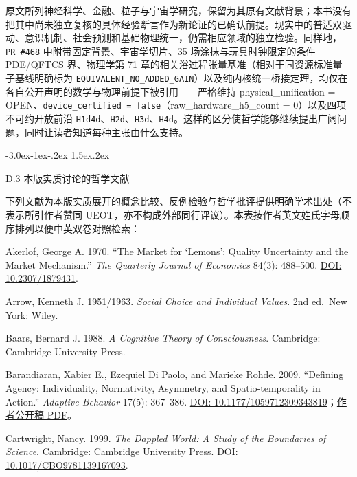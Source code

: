 \documentclass[
  11pt,
  oneside]{book}
\makeatletter
\renewcommand\section{\@startsection{section}{1}{\z@}%
  {-3.0ex\@plus-1ex\@minus-.2ex}%
  {1.5ex\@plus.2ex}%
  {\normalfont\Large\bfseries\raggedright\hyphenpenalty=10000\exhyphenpenalty=10000}}
\makeatother
\begin{document}
原文所列神经科学、金融、粒子与宇宙学研究，保留为其原有文献背景；本书没有把其中尚未独立复核的具体经验断言作为新论证的已确认前提。现实中的普适双驱动、意识机制、社会预测和基础物理统一，仍需相应领域的独立检验。同样地，\texttt{PR\ \#468} 中附带固定背景、宇宙学切片、35 场涂抹与玩具时钟限定的条件 PDE/QFTCS 界、物理学第 71 章的相关浴过程张量基准（相对于同资源标准量子基线明确标为 \texttt{EQUIVALENT\_NO\_ADDED\_GAIN}）以及纯内核统一桥接定理，均仅在各自公开声明的数学与物理前提下被引用------严格维持 physical\_unification = OPEN、\texttt{device\_certified\ =\ false}（raw\_hardware\_h5\_count = 0）以及四项不可约开放前沿 \texttt{H1d4d}、\texttt{H2d}、\texttt{H3d}、\texttt{H4d}。这样的区分使哲学能够继续提出广阔问题，同时让读者知道每种主张由什么支持。

\section{D.3 本版实质讨论的哲学文献}\label{ph-d-3}

\begingroup\small\raggedright\setlength{\parskip}{0.25em}

下列文献为本版实质展开的概念比较、反例检验与哲学批评提供明确学术出处（不表示所引作者赞同 UEOT，亦不构成外部同行评议）。本表按作者英文姓氏字母顺序排列以便中英双卷对照检索：

Akerlof, George A. 1970. ``The Market for `Lemons': Quality Uncertainty and the Market Mechanism.'' \emph{The Quarterly Journal of Economics} 84(3): 488--500. \href{https://doi.org/10.2307/1879431}{DOI: 10.2307/1879431}.

Arrow, Kenneth J. 1951/1963. \emph{Social Choice and Individual Values}. 2nd ed.~New York: Wiley.

Baars, Bernard J. 1988. \emph{A Cognitive Theory of Consciousness}. Cambridge: Cambridge University Press.

Barandiaran, Xabier E., Ezequiel Di Paolo, and Marieke Rohde. 2009. ``Defining Agency: Individuality, Normativity, Asymmetry, and Spatio-temporality in Action.'' \emph{Adaptive Behavior} 17(5): 367--386. \href{https://doi.org/10.1177/1059712309343819}{DOI: 10.1177/1059712309343819}；\href{https://xabier.barandiaran.net/wp-content/uploads/2009/07/barandiaran_dipaolo_rohde_-_defining_agency_v_1_0_-_jab_20091.pdf}{作者公开稿 PDF}。

Cartwright, Nancy. 1999. \emph{The Dappled World: A Study of the Boundaries of Science}. Cambridge: Cambridge University Press. \href{https://doi.org/10.1017/CBO9781139167093}{DOI: 10.1017/CBO9781139167093}.
\end{document}
